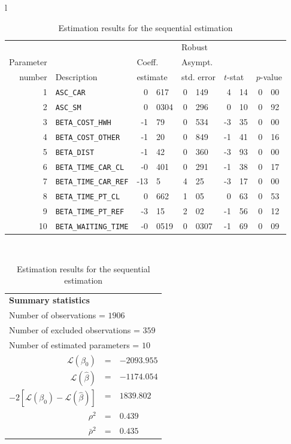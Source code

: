 \documentclass[12pt,a4paper]{article}
\begin{document}
 \begin{table}[htb]
\caption{\label{tab:sequential}Estimation results for the sequential estimation}
  \begin{tabular}{l}
\begin{tabular}{rlr@{.}lr@{.}lr@{.}lr@{.}l}
         &                       &   \multicolumn{2}{l}{}    & \multicolumn{2}{l}{Robust}  &     \multicolumn{4}{l}{}   \\
Parameter &                       &   \multicolumn{2}{l}{Coeff.}      & \multicolumn{2}{l}{Asympt.}  &     \multicolumn{4}{l}{}   \\
number &  Description                     &   \multicolumn{2}{l}{estimate}      & \multicolumn{2}{l}{std. error}  &   \multicolumn{2}{l}{$t$-stat}  &   \multicolumn{2}{l}{$p$-value}   \\

\hline

1 & \lstinline$ASC_CAR$ & 0&617 & 0&149 & 4&14 & 0&00\\
2 & \lstinline$ASC_SM$ & 0&0304 & 0&296 & 0&10 & 0&92\\
3 & \lstinline$BETA_COST_HWH$ & -1&79 & 0&534 & -3&35 & 0&00\\
4 & \lstinline$BETA_COST_OTHER$ & -1&20 & 0&849 & -1&41 & 0&16\\
5 & \lstinline$BETA_DIST$ & -1&42 & 0&360 & -3&93 & 0&00\\
6 & \lstinline$BETA_TIME_CAR_CL$ & -0&401 & 0&291 & -1&38 & 0&17\\
7 & \lstinline$BETA_TIME_CAR_REF$ & -13&5 & 4&25 & -3&17 & 0&00\\
8 & \lstinline$BETA_TIME_PT_CL$ & 0&662 & 1&05 & 0&63 & 0&53\\
9 & \lstinline$BETA_TIME_PT_REF$ & -3&15 & 2&02 & -1&56 & 0&12\\
10 & \lstinline$BETA_WAITING_TIME$ & -0&0519 & 0&0307 & -1&69 & 0&09\\
\hline
\end{tabular}
\\
\begin{tabular}{rcl}
\multicolumn{3}{l}{\bf Summary statistics}\\
\multicolumn{3}{l}{ Number of observations = $1906$} \\
\multicolumn{3}{l}{ Number of excluded observations = $359$} \\
\multicolumn{3}{l}{ Number of estimated  parameters = $10$} \\
 $\mathcal{L}(\beta_0)$ &=&  $-2093.955$ \\
 $\mathcal{L}(\hat{\beta})$ &=& $-1174.054 $  \\
 $-2[\mathcal{L}(\beta_0) -\mathcal{L}(\hat{\beta})]$ &=& $1839.802$ \\
    $\rho^2$ &=&   $0.439$ \\
    $\bar{\rho}^2$ &=&    $0.435$ \\
\end{tabular}
  \end{tabular}
\end{table}
\end{document}
